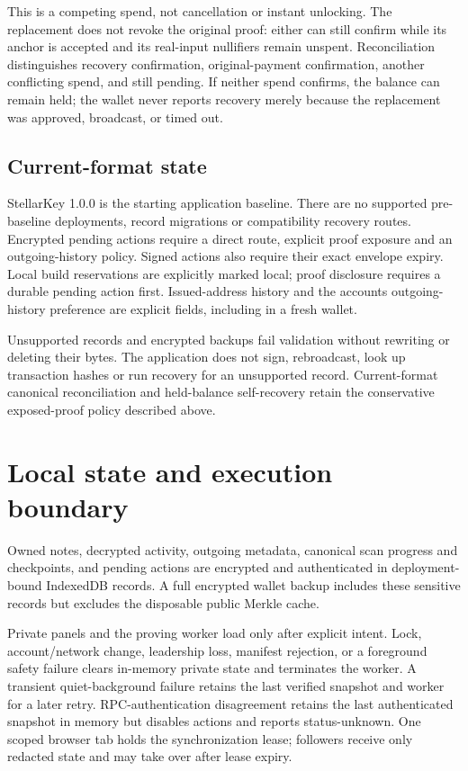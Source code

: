 \documentclass[11pt,letterpaper]{article}
\begin{document}
This is a competing spend, not cancellation or instant unlocking. The
replacement does not revoke the original proof: either can still confirm
while its anchor is accepted and its real-input nullifiers remain
unspent. Reconciliation distinguishes recovery confirmation,
original-payment confirmation, another conflicting spend, and still
pending. If neither spend confirms, the balance can remain held; the
wallet never reports recovery merely because the replacement was
approved, broadcast, or timed out.

\subsection{Current-format state}\label{current-format-state}

StellarKey 1.0.0 is the starting application baseline. There are no
supported pre-baseline deployments, record migrations or compatibility
recovery routes. Encrypted pending actions require a direct route,
explicit proof exposure and an outgoing-history policy. Signed actions
also require their exact envelope expiry. Local build reservations are
explicitly marked local; proof disclosure requires a durable pending
action first. Issued-address history and the account\textquotesingle s
outgoing-history preference are explicit fields, including in a fresh
wallet.

Unsupported records and encrypted backups fail validation without
rewriting or deleting their bytes. The application does not sign,
rebroadcast, look up transaction hashes or run recovery for an
unsupported record. Current-format canonical reconciliation and
held-balance self-recovery retain the conservative exposed-proof policy
described above.

\section{Local state and execution
boundary}\label{local-state-and-execution-boundary}

Owned notes, decrypted activity, outgoing metadata, canonical scan
progress and checkpoints, and pending actions are encrypted and
authenticated in deployment-bound IndexedDB records. A full encrypted
wallet backup includes these sensitive records but excludes the
disposable public Merkle cache.

Private panels and the proving worker load only after explicit intent.
Lock, account/\allowbreak{}network change, leadership loss, manifest
rejection, or a foreground safety failure clears in-memory private state
and terminates the worker. A transient quiet-background failure retains
the last verified snapshot and worker for a later retry.
RPC-authentication disagreement retains the last authenticated snapshot
in memory but disables actions and reports status-unknown. One scoped
browser tab holds the synchronization lease; followers receive only
redacted state and may take over after lease expiry.
\end{document}
